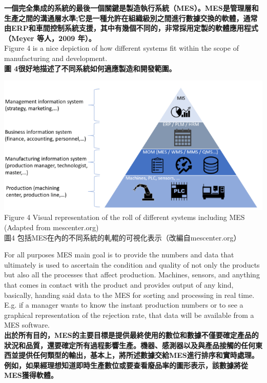 \documentclass[24pt]{article} %
\begin{document}
\textbf{一個完全集成的系統的最後一個關鍵是製造執行系統（MES）。MES是管理層和生產之間的溝通層水準;它是一種允許在組織級別之間進行數據交換的軟體，通常由ERP和車間控制系統支援，其中有幾個不同的，非常採用定製的軟體應用程式（Meyer 等人，2009 年）。}\\

Figure 4 is a nice depiction of how different systems fit within the scope of manufacturing and development.\\

\textbf{圖 4很好地描述了不同系統如何適應製造和開發範圍。}\\

\begin{center}
\includegraphics[width=15cm]{4.png}\\

Figure 4 Visual representation of the roll of different systems including MES (Adapted from mescenter.org)  \\

圖4 包括MES在內的不同系統的軋輥的可視化表示（改編自mescenter.org） \\

\end{center}

For all purposes MES main goal is to provide the numbers and data that ultimately is used to ascertain the condition and quality of not only the products but also all the processes that affect production. Machines, sensors, and anything that comes in contact with the product and provides output of any kind, basically, handing said data to the MES for sorting and processing in real time. E.g. if a manager wants to know the instant production numbers or to see a graphical representation of the rejection rate, that data will be available from a MES software.\\

\textbf{出於所有目的，MES的主要目標是提供最終使用的數位和數據不僅要確定產品的狀況和品質，還要確定所有過程影響生產。機器、感測器以及與產品接觸的任何東西並提供任何類型的輸出，基本上，將所述數據交給MES進行排序和實時處理。例如，如果經理想知道即時生產數位或要查看廢品率的圖形表示，該數據將從MES獲得軟體。}\\
\end{document}
